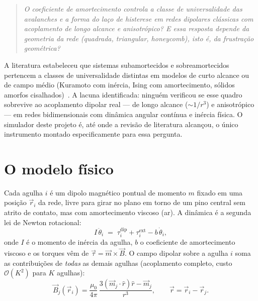 \documentclass[11pt,a4paper]{article}
\begin{document}
\begin{quote}\itshape
O coeficiente de amortecimento controla a classe de universalidade das
avalanches e a forma do laço de histerese em redes dipolares clássicas
com acoplamento de longo alcance e anisotrópico? E essa resposta depende
da geometria da rede (quadrada, triangular, honeycomb), isto é, da
frustração geométrica?
\end{quote}

A literatura estabeleceu que sistemas subamortecidos e sobreamortecidos
pertencem a classes de universalidade distintas em modelos de curto
alcance ou de campo médio (Kuramoto com inércia, Ising com
amortecimento, sólidos amorfos cisalhados)~\cite{dahmen2011}. A lacuna
identificada: ninguém verificou se esse quadro sobrevive ao acoplamento
dipolar real --- de longo alcance ($\sim 1/r^3$) e anisotrópico --- em
redes bidimensionais com dinâmica angular contínua e inércia física. O
simulador deste projeto é, até onde a revisão de literatura alcançou, o
único instrumento montado especificamente para essa pergunta.

\section{O modelo físico}

Cada agulha $i$ é um dipolo magnético pontual de momento $m$ fixado em
uma posição $\vec r_i$ da rede, livre para girar no plano em torno de um
pino central sem atrito de contato, mas com amortecimento viscoso (ar).
A dinâmica é a segunda lei de Newton rotacional:
\begin{equation}
I\,\ddot\theta_i \;=\; \tau_i^{\mathrm{dip}} + \tau_i^{\mathrm{ext}}
- b\,\dot\theta_i,
\label{eq:eom}
\end{equation}
onde $I$ é o momento de inércia da agulha, $b$ o coeficiente de
amortecimento viscoso e os torques vêm de $\vec\tau = \vec m \times \vec
B$. O campo dipolar sobre a agulha $i$ soma as contribuições de
\emph{todas} as demais agulhas (acoplamento completo, custo
$\mathcal{O}(K^2)$ para $K$ agulhas):
\begin{equation}
\vec B_j(\vec r_i) = \frac{\mu_0}{4\pi}\,
\frac{3(\vec m_j \cdot \hat r)\hat r - \vec m_j}{r^3},
\qquad \vec r = \vec r_i - \vec r_j .
\end{equation}
\end{document}
